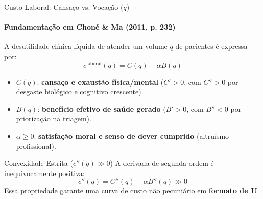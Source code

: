 \documentclass[aspectratio=169, 10pt]{beamer}
\begin{document}
\begin{frame}{Custo Laboral: Cansaço vs. Vocação ($q$)}
  \framesubtitle{Fundamentação em Choné \& Ma (2011, p. 232)}

  A desutilidade clínica líquida de atender um volume $q$ de pacientes é expressa por:
  \begin{equation}
    c^{\text{laboral}}(q) = C(q) - \alpha B(q)
  \end{equation}

  \begin{itemize}
    \item $C(q)$: \textbf{cansaço e exaustão física/mental} ($C' > 0$, com $C'' > 0$ por desgaste biológico e cognitivo crescente).
    \item $B(q)$: \textbf{benefício efetivo de saúde gerado} ($B' > 0$, com $B'' < 0$ por priorização na triagem).
    \item $\alpha \ge 0$: \textbf{satisfação moral e senso de dever cumprido} (altruísmo profissional).
  \end{itemize}

  \vspace{0.2cm}
  \begin{alertblock}{Convexidade Estrita ($c''(q) \gg 0$)}
    A derivada de segunda ordem é inequivocamente positiva:
    \begin{equation}
      c''(q) = C''(q) - \alpha B''(q) \gg 0
    \end{equation}
    Essa propriedade garante uma curva de custo não pecuniário em \textbf{formato de U}.
  \end{alertblock}
\end{frame}
\end{document}
